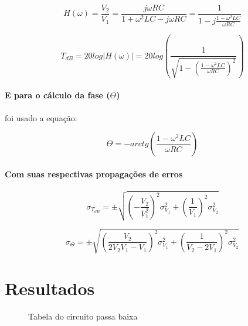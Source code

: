 \documentclass[a4paper]{article}
\begin{document}
$$
	H(\omega) = 
	\frac{V_2}{V_1} = 
    \frac{j \omega R C}{1 + \omega^2 L C - j \omega R C} =
    \frac{1}{1 - j\frac{1 - \omega^2 L C}{\omega R C}}
$$

$$
	T_{dB} = 
    20 log|H(\omega)| = 
    20 log(\frac{1}{\sqrt{1 - (\frac{1 - \omega^2 L C}{\omega R C})^2}})
$$

\paragraph{E para o cálculo da fase ($\Theta$)} foi usado a equação:

$$
	\Theta =
    -arctg(\frac{1 - \omega^2 L C}{\omega R C})
$$

\paragraph{Com suas respectivas propagações de erros}

$$
	\sigma_{T_{dB}} = \pm
    \sqrt{
    	(-\frac{V_2}{V_1^2})^2 \sigma_{V_1}^2 +
    	(\frac{1}{V_1})^2 \sigma_{V_2}^2
    }
$$

$$
	\sigma_\Theta = \pm
    \sqrt{
    	(\frac{V_2}{2 V_2 V_1 - V_1})^2 \sigma_{V_1}^2 +
    	(\frac{1}{V_2 - 2 V_1})^2 \sigma_{V_2}^2 
    }
$$

\section{Resultados} 

\begin{figure} [H] 
    \centering
    \loadedtable
    \pgfplotstabletypeset{\loadedtable}
    \caption{Tabela do circuito passa baixa}
    \label{fig:tbaixa}
\end{figure}
\end{document}
